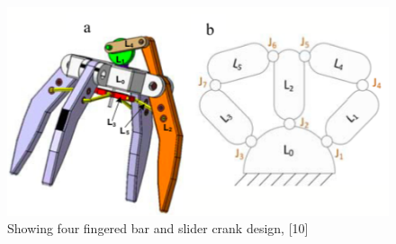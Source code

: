 \documentclass{l4proj}
\begin{document}
\begin{figure}[!ht]
    \centering
    \includegraphics[width=0.75\linewidth]{images/fourfingered.png}    

    \caption{Showing four fingered bar and slider crank design, [10]}
\end{figure}
\end{document}
